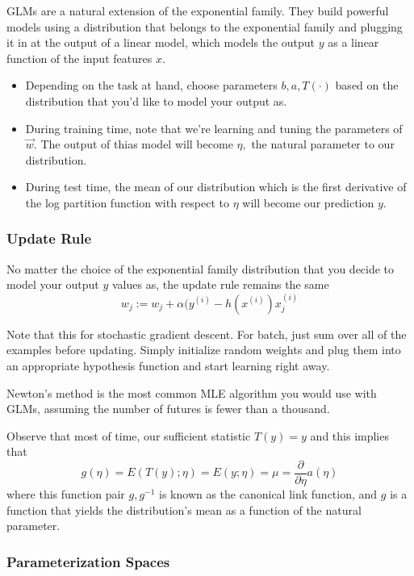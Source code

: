 \documentclass[12pt]{scrartcl}
\begin{document}
GLMs are a natural extension of the exponential family. They build powerful
models using a distribution that belongs to the exponential family and plugging
it in at the output of a linear model, which models the output $y$ as a linear
function of the input features $x$.
\begin{itemize}
    \item Depending on the task at hand, choose parameters $b, a, T(\cdot)$ based on the
          distribution that you'd like to model your output as.
    \item During training time, note that we're learning and tuning the parameters of
          $\vec{w}$. The output of thias model will become $\eta, $ the natural parameter
          to our distribution.
    \item During test time, the mean of our distribution which is the first derivative of
          the log partition function with respect to $\eta$ will become our prediction
          $y$.
\end{itemize}

\subsubsection{Update Rule}

No matter the choice of the exponential family distribution that you decide to
model your output $y$ values as, the update rule remains the same
\[w_j := w_j + \alpha (y^{(i)} - h(x^{(i)})x_j^{(i)}\]

Note that this for stochastic gradient descent. For batch, just sum over all of
the examples before updating. Simply initialize random weights and plug them
into an appropriate hypothesis function and start learning right away.

\begin{note}
    Newton's method is the most common MLE algorithm you would use with GLMs, assuming the number of futures is fewer than a thousand.
\end{note}

Observe that most of time, our sufficient statistic $T(y) = y$ and this implies
that
\[g(\eta) = E(T(y); \eta) = E(y; \eta) = \mu = \frac{\partial}{\partial \eta}a(\eta)\]
where this function pair $g, g^{-1}$ is known as the canonical link function,
and $g$ is a function that yields the distribution's mean as a function of the
natural parameter.

\subsubsection{Parameterization Spaces}
\end{document}

